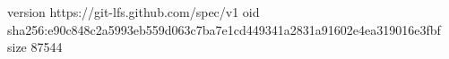 version https://git-lfs.github.com/spec/v1
oid sha256:e90c848c2a5993eb559d063c7ba7e1cd449341a2831a91602e4ea319016e3fbf
size 87544
